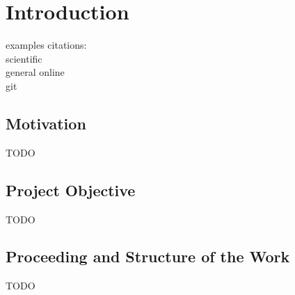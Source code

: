 \chapter{Introduction}
examples citations:
\\
scientific \cite{doi:10.1162/neco.1989.1.4.541}
\\
general online \cite{LSVRC}
\\
git \cite{chollet2015}
\\

\section{Motivation}
TODO

\section{Project Objective}
TODO

\section{Proceeding and Structure of the Work}
TODO